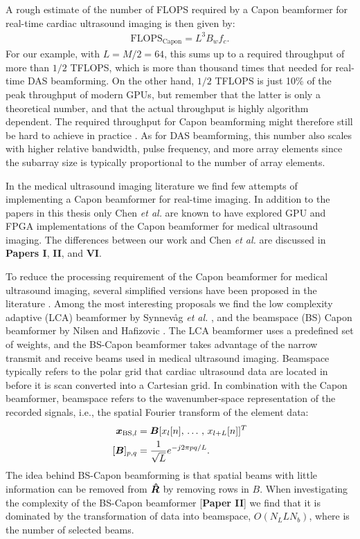 A rough estimate of the number of FLOPS required by a Capon beamformer for real-time cardiac ultrasound imaging is then given by:
\begin{align}
\text{FLOPS}_{\text{Capon}} = L^3B_wf_c.
\end{align}
For our example, with $L=M/2=64$, this sums up to a required throughput of more than $1/2$ TFLOPS, which is more than thousand times that needed for real-time DAS beamforming. On the other hand, $1/2$ TFLOPS is just 10\% of the peak throughput of modern GPUs, but remember that the latter is only a theoretical number, and that the actual throughput is highly algorithm dependent. The required throughput for Capon beamforming might therefore still be hard to achieve in practice \cite[\textbf{Paper II}]{So2011}. As for DAS beamforming, this number also scales with higher relative bandwidth, pulse frequency, and more array elements since the subarray size is typically proportional to the number of array elements. 

In the medical ultrasound imaging literature we find few attempts of implementing a Capon beamformer for real-time imaging. In addition to the papers in this thesis only Chen \textit{et al.} \cite{Chen2011, Chen, Chen2011a} are known to have explored GPU and FPGA implementations of the Capon beamformer for medical ultrasound imaging. The differences between our work and Chen \textit{et al.} are discussed in \textbf{Papers I}, \textbf{II}, and \textbf{VI}.

To reduce the processing requirement of the Capon beamformer for medical ultrasound imaging, several simplified versions have been proposed in the literature \cite{Asl2012, Kim}. Among the most interesting proposals we find the low complexity adaptive (LCA) beamformer by Synnev\aa{}g \textit{et al.} \cite{Synnevag2011},  and the beamspace (BS) Capon beamformer by Nilsen and Hafizovic \cite{Nilsen2009}. The LCA beamformer uses a predefined set of weights, and the BS-Capon beamformer takes advantage of the narrow transmit and receive beams used in medical ultrasound imaging. Beamspace typically refers to the polar grid that cardiac ultrasound data are located in before it is scan converted into a Cartesian grid. In combination with the Capon beamformer, beamspace refers to the wavenumber-space representation of the recorded signals, i.e., the spatial Fourier transform of the element data: 
\begin{align}
\vec{x}_{\text{BS},l} &= \mat{B}[x_l[n],\,\dotso,\,x_{l+L}[n]]^T\\
[\mat{B}]_{p,q} &= \frac{1}{\sqrt{L}}e^{-j 2 \pi p q / L}.
\end{align}
The idea behind BS-Capon beamforming is that spatial beams with little information can be removed from $\boldsymbol{\hat{R}}$ by removing rows in $B$. When investigating the complexity of the BS-Capon beamformer [\textbf{Paper II}] we find that it is dominated by the transformation of data into beamspace, $O(N_LLN_b)$, where  is the number of selected beams. 


